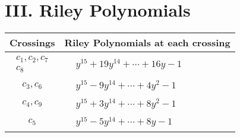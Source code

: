 \documentclass[1p]{elsarticle_modified}
\theoremstyle{definition}
\begin{document}
\centering \section*{ III. Riley Polynomials}
\begin{tabular}{m{50pt}|m{274pt}}
Crossings & \hspace{64pt}Riley Polynomials at each crossing \\
\hline $$\begin{aligned}c_{1},c_{2},c_{7}\\c_{8}\end{aligned}$$&$\begin{aligned}
&y^{15}+19 y^{14}+\cdots+16 y-1
\end{aligned}$\\
\hline $$\begin{aligned}c_{3},c_{6}\end{aligned}$$&$\begin{aligned}
&y^{15}-9 y^{14}+\cdots+4 y^2-1
\end{aligned}$\\
\hline $$\begin{aligned}c_{4},c_{9}\end{aligned}$$&$\begin{aligned}
&y^{15}+3 y^{14}+\cdots+8 y^2-1
\end{aligned}$\\
\hline $$\begin{aligned}c_{5}\end{aligned}$$&$\begin{aligned}
&y^{15}-5 y^{14}+\cdots+8 y-1
\end{aligned}$\\
\hline
\end{tabular}
\vskip 2pc
\end{document}
